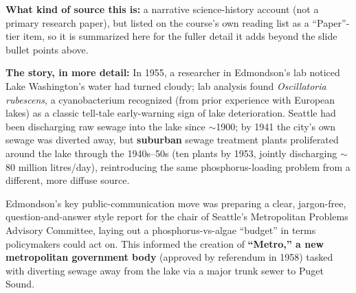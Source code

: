 \documentclass[11pt,a4paper]{article}
\begin{document}
\begin{papbox}[title={Paper Summary: ``Rescue of Lake Stinko'' -- the story of the Lake Washington restoration (University of Washington, based on W.T.\ Edmondson's research)}]
\textbf{What kind of source this is:} a narrative science-history account (not a primary research paper), but listed on the course's own reading list as a ``Paper''-tier item, so it is summarized here for the fuller detail it adds beyond the slide bullet points above.

\textbf{The story, in more detail:} In 1955, a researcher in Edmondson's lab noticed Lake Washington's water had turned cloudy; lab analysis found \textit{Oscillatoria rubescens}, a cyanobacterium recognized (from prior experience with European lakes) as a classic tell-tale early-warning sign of lake deterioration. Seattle had been discharging raw sewage into the lake since $\sim$1900; by 1941 the city's own sewage was diverted away, but \textbf{suburban} sewage treatment plants proliferated around the lake through the 1940s--50s (ten plants by 1953, jointly discharging $\sim$80 million litres/day), reintroducing the same phosphorus-loading problem from a different, more diffuse source.

Edmondson's key public-communication move was preparing a clear, jargon-free, question-and-answer style report for the chair of Seattle's Metropolitan Problems Advisory Committee, laying out a phosphorus-vs-algae ``budget'' in terms policymakers could act on. This informed the creation of \textbf{``Metro,'' a new metropolitan government body} (approved by referendum in 1958) tasked with diverting sewage away from the lake via a major trunk sewer to Puget Sound.


\end{papbox}
\end{document}
